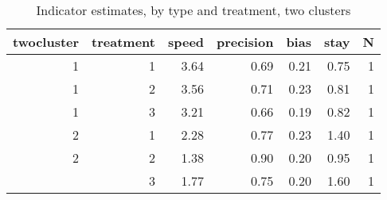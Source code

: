 \begin{table}

\caption{\label{tab:}Indicator estimates, by type and treatment, two clusters}
\centering
\begin{tabular}[t]{rrrrrrr}
\toprule
twocluster & treatment & speed & precision & bias & stay & N\\
\midrule
1 & 1 & 3.64 & 0.69 & 0.21 & 0.75 & 1\\
1 & 2 & 3.56 & 0.71 & 0.23 & 0.81 & 1\\
1 & 3 & 3.21 & 0.66 & 0.19 & 0.82 & 1\\
2 & 1 & 2.28 & 0.77 & 0.23 & 1.40 & 1\\
2 & 2 & 1.38 & 0.90 & 0.20 & 0.95 & 1\\
\addlinespace
2 & 3 & 1.77 & 0.75 & 0.20 & 1.60 & 1\\
\bottomrule
\end{tabular}
\end{table}
